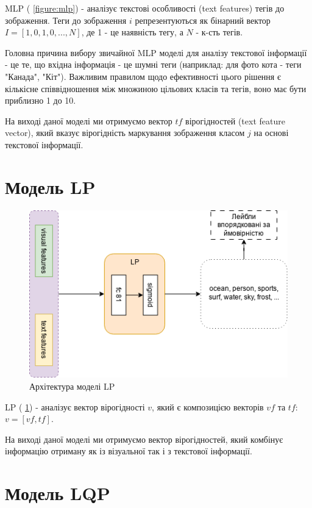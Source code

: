 \documentclass{udstu}
\begin{document}
MLP (\figurename{ \ref{figure:mlp}}) - аналізує текстові особливості (text features) тегів до зображення.
Теги до зображення $i$ репрезентуються як бінарний вектор $I = [1,0,1,0, ..., N]$,
де 1 - це наявність тегу, а $N$ - к-сть тегів.

Головна причина вибору звичайної MLP моделі для аналізу текстової інформації - це
те, що вхідна інформація - це шумні теги (наприклад: для фото кота - теги "Канада", "Кіт").
Важливим правилом щодо ефективності цього рішення є кількісне співвідношення між множиною
цільових класів та тегів, воно має бути приблизно 1 до 10.

На виході даної моделі ми отримуємо вектор $tf$ вірогідностей (text feature vector),
який вказує вірогідність маркування зображення класом $j$ на основі текстової інформації.


\section{Модель LP}

\begin{figure}[!ht]
	\centering
	\includegraphics[width=1.0\textwidth]{PNG/lp}
	\caption{Архітектура моделі LP}
	\label{figure:lp}
\end{figure}

LP (\figurename{ \ref{figure:lp}}) - аналізує вектор вірогідності $v$,
який є композицією векторів $vf$ та $tf$: $v = [vf, tf]$.

На виході даної моделі ми отримуємо вектор вірогідностей, який комбінує інформацію отриману як із візуальної так і з
текстової інформації.


\section{Модель LQP}
\end{document}
